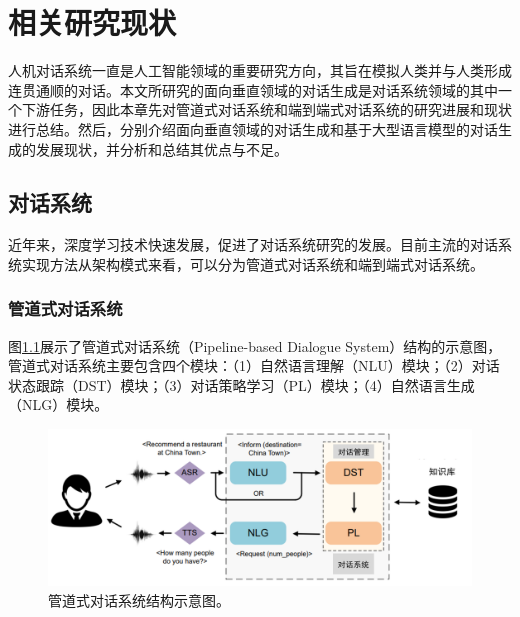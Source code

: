 \chapter{相关研究现状}

人机对话系统一直是人工智能领域的重要研究方向，其旨在模拟人类并与人类形成连贯通顺的对话。本文所研究的面向垂直领域的对话生成是对话系统领域的其中一个下游任务，因此本章先对管道式对话系统和端到端式对话系统的研究进展和现状进行总结。然后，分别介绍面向垂直领域的对话生成和基于大型语言模型的对话生成的发展现状，并分析和总结其优点与不足。

\section{对话系统}

近年来，深度学习技术快速发展，促进了对话系统研究的发展\cite{JSJX201907001}。目前主流的对话系统实现方法从架构模式来看，可以分为管道式对话系统和端到端式对话系统。

\subsection{管道式对话系统}

图\ref{pipeline_dialogue_system}展示了管道式对话系统（Pipeline-based Dialogue System）结构的示意图，管道式对话系统主要包含四个模块：（1）自然语言理解（NLU）模块；（2）对话状态跟踪（DST）模块；（3）对话策略学习（PL）模块；（4）自然语言生成（NLG）模块。

\begin{figure}[htbp]
	\centering
	\includegraphics[scale=0.55]{Fig/pipeline_dialogue_system.png}
	\caption{\label{pipeline_dialogue_system}管道式对话系统结构示意图\cite{DBLP:journals/air/NiYPXC23}。}
\end{figure}

